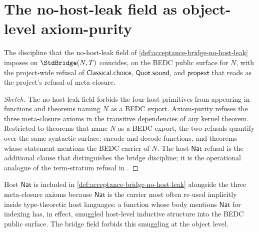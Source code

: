 \section{The no-host-leak field as object-level axiom-purity}
\label{sec:acceptance-bridge-no-leak-axiom-purity}

\begin{theorem}
\label{thm:acceptance-bridge-no-leak-axiom-purity}
The discipline that the no-host-leak field of \autoref{def:acceptance-bridge-no-host-leak} imposes on $\StdBridge(N,T)$ coincides, on the BEDC public surface for $N$, with the project-wide refusal of $\mathsf{Classical.choice}$, $\mathsf{Quot.sound}$, and $\mathsf{propext}$ that  reads as the project's refusal of meta-closure.
\end{theorem}
\begin{proof}[Sketch]
The no-host-leak field forbids the four host primitives from appearing in functions and theorems naming $N$ as a BEDC export. Axiom-purity refuses the three meta-closure axioms in the transitive dependencies of any kernel theorem. Restricted to theorems that name $N$ as a BEDC export, the two refusals quantify over the same syntactic surface: encode and decode functions, and theorems whose statement mentions the BEDC carrier of $N$. The host-$\mathsf{Nat}$ refusal is the additional clause that distinguishes the bridge discipline; it is the operational analogue of the term-stratum refusal in .
\end{proof}

\begin{remark}
\label{rem:acceptance-bridge-host-nat-named}
Host $\mathsf{Nat}$ is included in \autoref{def:acceptance-bridge-no-host-leak} alongside the three meta-closure axioms because $\mathsf{Nat}$ is the carrier most often re-used implicitly inside type-theoretic host languages: a function whose body mentions $\mathsf{Nat}$ for indexing has, in effect, smuggled host-level inductive structure into the BEDC public surface. The bridge field forbids this smuggling at the object level.
\end{remark}

